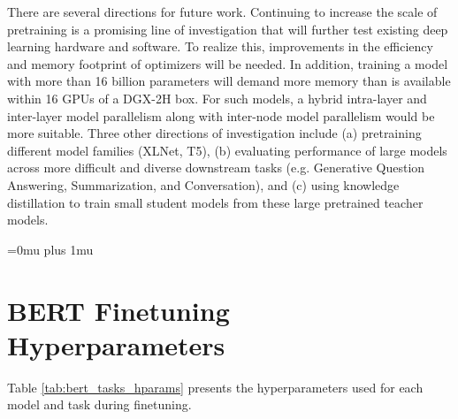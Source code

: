 \documentclass{article}
\begin{document}
There are several directions for future work. Continuing to increase the scale of pretraining is a promising line of investigation that will further test existing deep learning hardware and software. To realize this, improvements in the efficiency and memory footprint of optimizers will be needed. In addition, training a model with more than 16 billion parameters will demand more memory than is available within 16 GPUs of a DGX-2H box. For such models, a hybrid intra-layer and inter-layer model parallelism along with inter-node model parallelism would be more suitable.
Three other directions of investigation include (a) pretraining different model families (XLNet, T5), (b) evaluating performance of large models across more difficult and diverse downstream tasks (e.g. Generative Question Answering, Summarization, and Conversation), and (c) using knowledge distillation to train small student models from these large pretrained teacher models.
 
\Urlmuskip=0mu plus 1mu\relax



\appendix




\section{BERT Finetuning Hyperparameters}
\label{app:berthparams}

Table \ref{tab:bert_tasks_hparams} presents the hyperparameters used for each model and task during finetuning.
\end{document}
